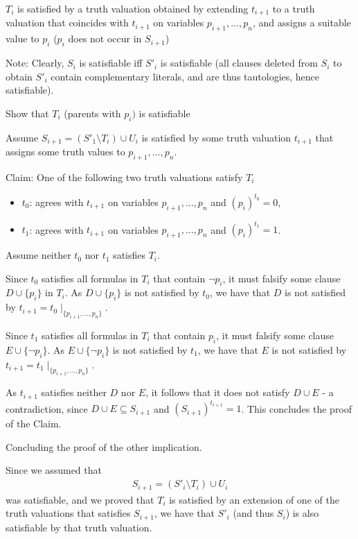 \documentclass{article}
\begin{document}
$T_i$ is satisfied by a truth valuation obtained by extending $t_{i+1}$ to a truth valuation that coincides with $t_{i+1}$ on variables $p_{i+1},\ldots,p_n$, and assigns a suitable value to $p_i$ ($p_i$ does not occur in $S_{i+1}$)

Note: Clearly, $S_i$ is satisfiable iff $S'_i$ is satisfiable (all clauses deleted from $S_i$ to obtain $S'_i$ contain complementary literals, and are thus tautologies, hence satisfiable).

Show that $T_i$ (parents with $p_i)$ is satisfiable

Assume $S_{i+1} = (S'_1 \setminus T_i) \cup U_i$ is satisfied by some truth valuation $t_{i+1}$ that assigns some truth values to $p_{i+1},\ldots,p_n$.

Claim: One of the following two truth valuations satisfy $T_i$
\begin{itemize}
    \item $t_0$: agrees with $t_{i+1}$ on variables $p_{i+1},\ldots,p_n$ and $(p_i)^{t_0} = 0$, 
    \item $t_1$: agrees with $t_{i+1}$ on variables $p_{i+1},\ldots,p_n$ and $(p_i)^{t_1} = 1$.
\end{itemize}

Assume neither $t_0$ nor $t_1$ satisfies $T_i$. 

Since $t_0$ satisfies all formulas in $T_i$ that contain $\neg p_i$, it must falsify some clause $D \cup \{p_i\}$ in $T_i$. As $D \cup \{p_i\}$ is not satisfied by $t_0$, we have that $D$ is not satisfied by $t_{i+1} = t_0 \mid_{\{p_{i+1},\ldots,p_n\}}$.

Since $t_1$ satisfies all formulas in $T_i$ that contain $p_i$, it must falsify some clause $E \cup \{\neg p_i\}$. As $E \cup \{\neg p_i\}$ is not satisfied by $t_1$, we have that $E$ is not satisfied by $t_{i+1} = t_1 \mid_{\{p_{i+1},\ldots,p_n\}}$.

As $t_{i+1}$ satisfies neither $D$ nor $E$, it follows that it does not satisfy $D \cup E$ - a contradiction, since $D \cup E \subseteq S_{i+1}$ and $(S_{i+1})^{t_{i+1}} = 1$. This concludes the proof of the Claim.

Concluding the proof of the other implication.

Since we assumed that
\begin{align*}
S_{i+1} = (S'_i \setminus T_i) \cup U_i
\end{align*}
was satisfiable, and we proved that $T_i$ is satisfied by an extension of one of the truth valuations that satisfies $S_{i+1}$, we have that $S'_i$ (and thus $S_i$) is also satisfiable by that truth valuation.
\end{document}
